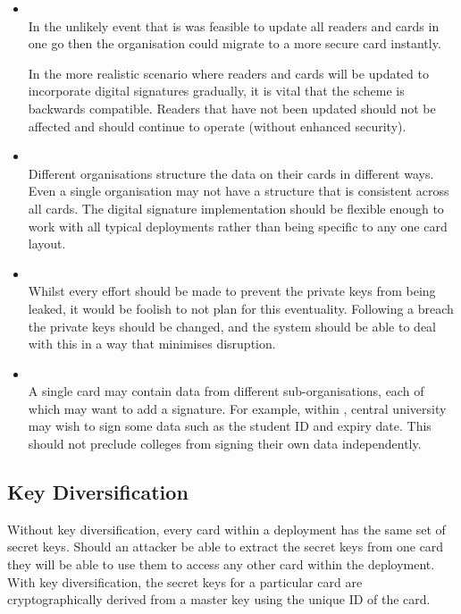 \documentclass[dissertation.tex]{subfiles}
\begin{document}
  \begin{itemize}
    \item {} \\
      In the unlikely event that is was feasible to update all readers and cards in one go then the organisation could migrate to a more secure card instantly.

      In the more realistic scenario where readers and cards will be updated to incorporate digital signatures gradually, it is vital that the scheme is backwards compatible. Readers that have not been updated should not be affected and should continue to operate (without enhanced security).

    \item {} \\
      Different organisations structure the data on their cards in different ways. Even a single organisation may not have a structure that is consistent across all cards. The digital signature implementation should be flexible enough to work with all typical deployments rather than being specific to any one card layout.

    \item {} \\
      Whilst every effort should be made to prevent the private keys from being leaked, it would be foolish to not plan for this eventuality. Following a breach the private keys should be changed, and the system should be able to deal with this in a way that minimises disruption.

    \item {} \\
      A single card may contain data from different sub-organisations, each of which may want to add a signature. For example, within \UoC{}, central university may wish to sign some data such as the student ID and expiry date. This should not preclude colleges from signing their own data independently.
  \end{itemize}


  \subsection{Key Diversification}

  Without key diversification, every card within a deployment has the same set of secret keys. Should an attacker be able to extract the secret keys from one card they will be able to use them to access any other card within the deployment. With key diversification, the secret keys for a particular card are cryptographically derived from a master key using the unique ID of the card.
\end{document}
